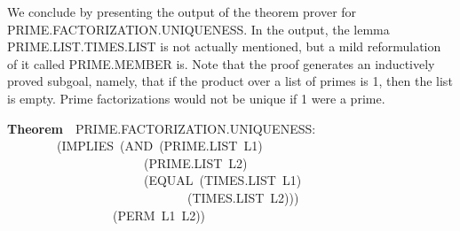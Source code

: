 \documentclass[10pt]{book}
\newenvironment{pubasis}{\begin{flushleft}}{\end{flushleft}}
\newcommand{\axiomordefinition}[1]{\vspace{6pt}\Large\textsf{\textbf{#1}}\normalsize}
\begin{document}
We conclude by presenting the output of the theorem
prover for PRIME.FACTORIZATION.UNIQUENESS.
In the output, the lemma PRIME.LIST.TIMES.LIST
is not actually mentioned, but a mild reformulation
of it called PRIME.MEMBER is.  Note that the proof generates an inductively
proved subgoal, namely, that if the product over
a list of primes is 1, then the list is empty.  Prime
factorizations would not be unique if 1 were a prime.
\begin{pubasis}
\axiomordefinition{Theorem}~~PRIME.FACTORIZATION.UNIQUENESS:\\
~~~~~~~~(IMPLIES~(AND~(PRIME.LIST~L1)\\
~~~~~~~~~~~~~~~~~~~~~~(PRIME.LIST~L2)\\
~~~~~~~~~~~~~~~~~~~~~~(EQUAL~(TIMES.LIST~L1)\\
~~~~~~~~~~~~~~~~~~~~~~~~~~~~~(TIMES.LIST~L2)))\\
~~~~~~~~~~~~~~~~~(PERM~L1~L2))\\
\end{pubasis}
\end{document}
